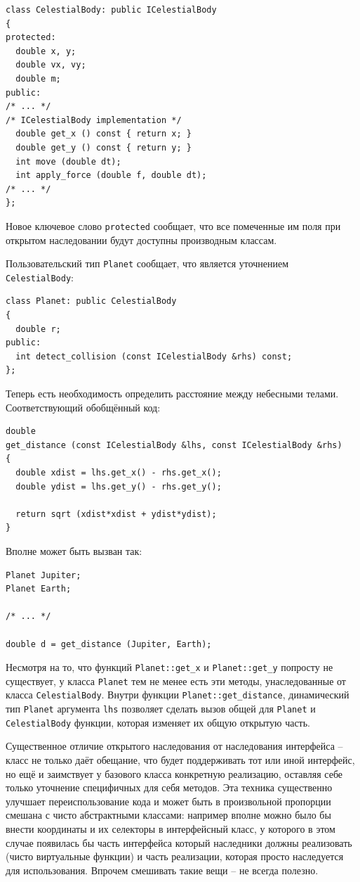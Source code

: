 \documentclass[a4paper,12pt,oneside]{article}
\begin{document}
\begin{lstlisting}
class CelestialBody: public ICelestialBody
{
protected:
  double x, y;
  double vx, vy;
  double m;
public:
/* ... */
/* ICelestialBody implementation */
  double get_x () const { return x; }
  double get_y () const { return y; }
  int move (double dt); 
  int apply_force (double f, double dt);
/* ... */
};
\end{lstlisting}

Новое ключевое слово \lstinline!protected! сообщает, что все помеченные им поля при открытом наследовании будут доступны производным классам.

Пользовательский тип \lstinline!Planet! сообщает, что является уточнением \lstinline!CelestialBody!:

\begin{lstlisting}
class Planet: public CelestialBody
{
  double r;
public:
  int detect_collision (const ICelestialBody &rhs) const;
};
\end{lstlisting}

Теперь есть необходимость определить расстояние между небесными телами. Соответствующий обобщённый код:

\begin{lstlisting}
double 
get_distance (const ICelestialBody &lhs, const ICelestialBody &rhs)
{
  double xdist = lhs.get_x() - rhs.get_x();
  double ydist = lhs.get_y() - rhs.get_y();

  return sqrt (xdist*xdist + ydist*ydist);
}
\end{lstlisting}

Вполне может быть вызван так:

\begin{lstlisting}
Planet Jupiter;
Planet Earth;

/* ... */

double d = get_distance (Jupiter, Earth);
\end{lstlisting}

Несмотря на то, что функций \lstinline!Planet::get_x! и \lstinline!Planet::get_y! попросту не существует, у класса \lstinline!Planet! тем не менее есть эти методы, унаследованные от класса \lstinline!CelestialBody!. Внутри функции \lstinline!Planet::get_distance!, динамический тип \lstinline!Planet! аргумента \lstinline!lhs! позволяет сделать вызов общей для \lstinline!Planet! и \lstinline!CelestialBody! функции, которая изменяет их общую открытую часть.

Существенное отличие открытого наследования от наследования интерфейса -- класс не только даёт обещание, что будет поддерживать тот или иной интерфейс, но ещё и заимствует у базового класса конкретную реализацию, оставляя себе только уточнение специфичных для себя методов. Эта техника существенно улучшает переиспользование кода и может быть в произвольной пропорции смешана с чисто абстрактными классами: например вполне можно было бы внести координаты и их селекторы в интерфейсный класс, у которого в этом случае появилась бы часть интерфейса который наследники должны реализовать (чисто виртуальные функции) и часть реализации, которая просто наследуется для использования. Впрочем смешивать такие вещи -- не всегда полезно.
\end{document}

